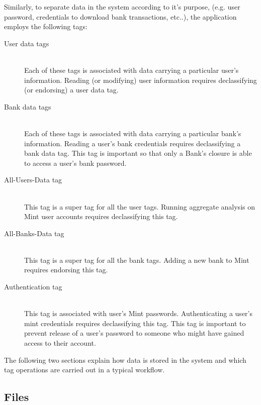 Similarly, to separate data in the system according to it's purpose, (e.g. user password, credentials to download bank transactions, etc..), the application employs the following tags:
\begin{description}
  \item[User data tags] \ \\
    Each of these tags is associated with data 
    carrying a particular user's information.
    Reading (or modifying) user information
    requires declassifying (or endorsing)
    a user data tag.
  \item[Bank data tags] \ \\
    Each of these tags is associated 
    with data carrying a particular bank's information.
    Reading a user's bank credentials
    requires declassifying a bank data tag. This tag is
    important so that only a Bank's closure is able
    to access a user's bank password.
  \item[All-Users-Data tag] \ \\ 
    This tag is a super tag for all the user 
    tags.
    Running aggregate analysis on Mint user accounts
    requires declassifying this tag.
  \item[All-Banks-Data tag] \ \\ 
    This tag is a super tag for all the bank tags.
    Adding a new bank to Mint requires endorsing
    this tag.
  \item[Authentication tag] \ \\
    This tag is associated with user's Mint passwords.
    Authenticating a user's mint credentials
    requires declassifying this tag.
    This tag is important to prevent release of
    a user's password to someone who might have
    gained access to their account.
\end{description}

The following two sections explain how data is stored in the system and which tag operations are carried out in a typical workflow.

\subsection{Files}\label{sec:mint-fs}

